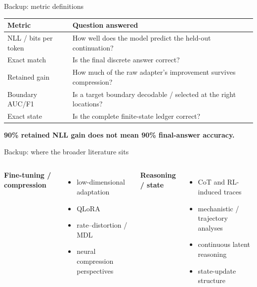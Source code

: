 \documentclass[aspectratio=169,10pt]{beamer}
\begin{document}
\begin{frame}{Backup: metric definitions}
\small
\begin{tabular}{p{}p{}}
\toprule
Metric & Question answered\\\midrule
NLL / bits per token & How well does the model predict the held-out continuation?\\
Exact match & Is the final discrete answer correct?\\
Retained gain & How much of the raw adapter's improvement survives compression?\\
Boundary AUC/F1 & Is a target boundary decodable / selected at the right locations?\\
Exact state & Is the complete finite-state ledger correct?\\
\bottomrule
\end{tabular}
\vfill
\begin{center}\bfseries 90\% retained NLL gain does not mean 90\% final-answer accuracy.\end{center}
\end{frame}

\begin{frame}{Backup: where the broader literature sits}
\small
\begin{columns}[T,onlytextwidth]
\textbf{Fine-tuning / compression}
\begin{itemize}
  \item low-dimensional adaptation \parencite{aghajanyan2021intrinsic,hu2022lora}
  \item QLoRA \parencite{dettmers2023qlora}
  \item rate--distortion / MDL \parencite{cover2006elements,grunwald2019mdl}
  \item neural compression perspectives \parencite{arora2018compression,young2025radio,liu2025paretoq}
\end{itemize}
\textbf{Reasoning / state}
\begin{itemize}
  \item CoT and RL-induced traces \parencite{wei2022chain,deepseekai2025r1}
  \item mechanistic / trajectory analyses \parencite{dutta2024step,yang2025symbolic,sun2026trajectories}
  \item continuous latent reasoning \parencite{hao2025coconut}
  \item state-update structure \parencite{fagnou2024chain}
\end{itemize}
\end{columns}
\end{frame}
\end{document}
